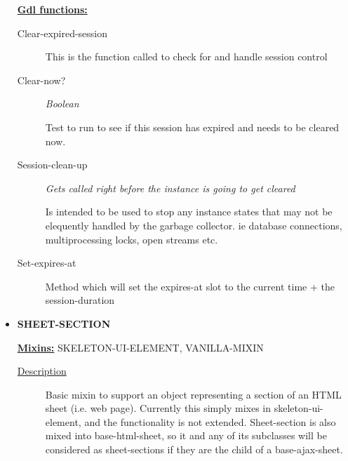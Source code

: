 \documentclass [11pt]{book}
\begin{document}
\begin{itemize}
\begin{description}
\end{description}






\textbf{
\underline{Gdl functions:}}

\begin{description}

\item [Clear-expired-session]

This is the function called to check for and handle session control




\item [Clear-now?]
\emph{Boolean}

 Test to run to see if this session has expired and needs to be cleared now.




\item [Session-clean-up]
\emph{Gets called right before the instance is going to get cleared}

 Is intended to be used to stop any instance states that may not be elequently handled by the garbage collector. ie database connections, multiprocessing locks, open streams etc.




\item [Set-expires-at]

Method which will set the expires-at slot to the current time + the session-duration




\end{description}







\item {}
\textbf{SHEET-SECTION}


\textbf{
\underline{Mixins:}} SKELETON-UI-ELEMENT, VANILLA-MIXIN





\begin{description}

\item [
\underline{Description}]


Basic mixin to support an object 
representing a section of an HTML sheet (i.e. web page). Currently 
this simply mixes in skeleton-ui-element, and the functionality is not 
extended. Sheet-section is also mixed into base-html-sheet, so it and 
any of its subclasses will be considered as sheet-sections if they 
are the child of a base-ajax-sheet.






\end{description}
\end{itemize}
\end{document}
